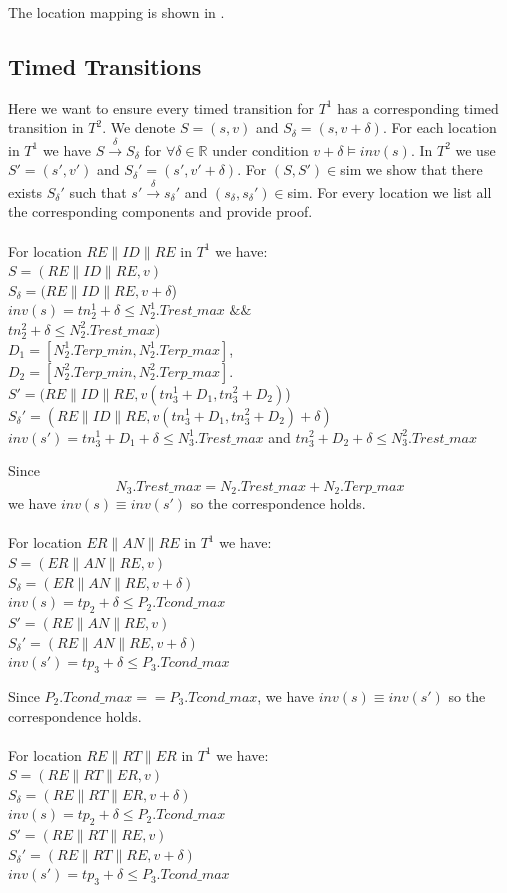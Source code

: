 The location mapping is shown in .
\subsection{Timed Transitions}
Here we want to ensure every timed transition for $T^1$ has a corresponding timed transition in $T^2$. We denote $S=(s,v)$ and $S_\delta=(s,v+\delta)$. For each location in $T^1$ we have $S\xrightarrow{\delta}S_\delta$ for $\forall \delta\in\mathbb{R}$ under condition $v+\delta\models inv(s)$. In $T^2$ we use $S'=(s',v')$ and $S_\delta '=(s',v'+\delta)$. For $(S,S')\in$\textsf{sim} we show that there exists $S_\delta '$ such that $s'\xrightarrow{\delta}s_\delta '$ and $(s_\delta,s_\delta ')\in$\textsf{sim}. For every location we list all the corresponding components and provide proof. \\
\\
For location $RE\| ID\| RE$ in $T^1$ we have:\\
$S=(RE\| ID\| RE,v)$\\
$S_\delta =(RE\| ID\| RE,v+\delta$)\\
$inv(s)=tn_2^1+\delta\leq N_2^1.Trest\_max$ $\&\&$\\ $tn_2^2+\delta\leq N_2^2.Trest\_max)$\\
$D_1=[N_2^1.Terp\_min,N_2^1.Terp\_max]$,\\
$D_2=[N_2^2.Terp\_min,N_2^2.Terp\_max]$.\\ 
$S'=(RE\| ID\| RE,v(tn_3^1+D_1,tn_3^2+D_2)$)\\
$S_\delta '=(RE\| ID\| RE,v(tn_3^1+D_1,tn_3^2+D_2)+\delta)$\\
$inv(s')=tn_3^1+D_1+\delta\leq N_3^1.Trest\_max$ and $tn_3^2+D_2+\delta\leq N_3^2.Trest\_max$

Since
$$N_3.Trest\_max = N_2.Trest\_max+N_2.Terp\_max$$
we have $inv(s)\equiv inv(s')$ so the correspondence holds.\\
\\
For location $ER\| AN\| RE$ in $T^1$ we have:\\
$S=(ER\| AN\| RE,v)$\\
$S_\delta=(ER\| AN\| RE,v+\delta)$\\
$inv(s)=tp_2+\delta\leq P_2.Tcond\_max$\\
$S'=(RE\| AN\| RE,v)$\\
$S_\delta '=(RE\| AN\| RE,v+\delta)$\\
$inv(s')=tp_3+\delta\leq P_3.Tcond\_max$

Since $P_2.Tcond\_max==P_3.Tcond\_max$, we have $inv(s)\equiv inv(s')$ so the correspondence holds.\\
\\
For location $RE\| RT\| ER$ in $T^1$ we have:\\
$S=(RE\| RT\| ER,v)$\\
$S_\delta=(RE\| RT\| ER,v+\delta)$\\
$inv(s)=tp_2+\delta\leq P_2.Tcond\_max$\\
$S'=(RE\| RT\| RE,v)$\\
$S_\delta '=(RE\| RT\| RE,v+\delta)$\\
$inv(s')=tp_3+\delta\leq P_3.Tcond\_max$

